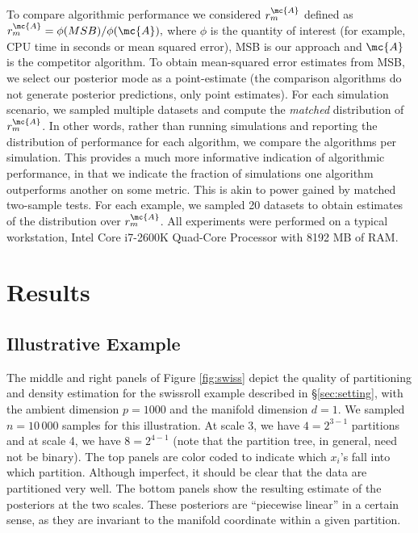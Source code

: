 To compare algorithmic performance we considered $r_{m}^{\mc{A}}$ defined as $r_{m}^{\mc{A}}=\phi(MSB)/\phi(\mc{A}),$
where $\phi$ is the quantity of interest (for example, CPU time in seconds or mean squared error), MSB is our approach and $\mc{A}$ is the competitor algorithm. To obtain mean-squared error estimates from MSB, we select our posterior mode as a point-estimate (the comparison algorithms do not generate posterior predictions, only point estimates).
For each simulation scenario, we sampled multiple datasets and compute the \emph{matched} distribution of $r_{m}^{\mc{A}}$. In other words, rather than running simulations and reporting the distribution of performance for each algorithm, we compare the algorithms per simulation.  This provides a much more informative indication of algorithmic performance, in that we indicate the fraction of simulations one algorithm outperforms another on some metric.  This is akin to power gained by matched two-sample tests.   For each example, we sampled 20 datasets to obtain estimates of the distribution over $r_m^{\mc{A}}$.
% 
All experiments were performed on a typical workstation, Intel Core i7-2600K Quad-Core Processor with  8192 MB of RAM.


\section{Results}

\subsection{Illustrative Example} \label{sub:ill}

The middle and right panels of Figure \ref{fig:swiss} depict the quality of partitioning and density estimation for the swissroll example described in \S \ref{sec:setting}, with the ambient dimension $p=1000$ and the manifold dimension $d=1$.  We sampled $n=10\,000$ samples for this illustration. At scale 3, we have $4=2^{3-1}$ partitions and at scale 4, we have $8=2^{4-1}$ (note that the partition tree, in general, need not be binary).  The top panels are color coded to indicate which  $x_i$'s fall into which partition.  Although imperfect, it should be clear that the data are partitioned very well.  The bottom panels show the resulting estimate of the posteriors at the two scales.  These posteriors are ``piecewise linear'' in a certain sense, as they are invariant to the manifold coordinate within a given partition.  


